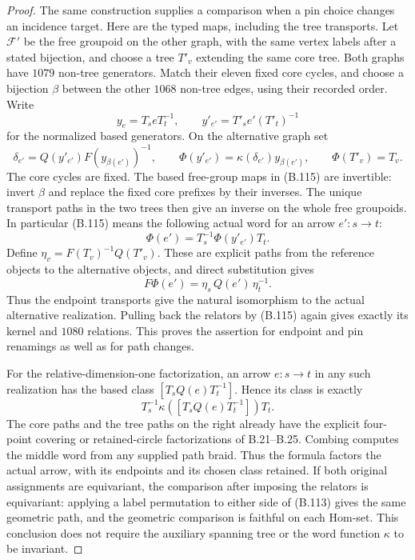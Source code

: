 \begin{proof}
The same construction supplies a comparison when a pin
choice changes an incidence target.  Here are the typed
maps, including the tree transports.  Let $\mathcal F'$
be the free groupoid on the other graph, with the same
vertex labels after a stated bijection, and choose a tree
$T'_v$ extending the same core tree.  Both graphs have
$1079$ non-tree generators.  Match their eleven fixed
core cycles, and choose a bijection $\beta$ between the
other $1068$ non-tree edges, using their recorded order.
Write
\[
 y_e=T_s eT_t^{-1},\qquad
 y'_{e'}=T'_s e'(T'_t)^{-1}
\]
for the normalized based generators.  On the alternative
graph set
\[
 \delta_{e'}=Q(y'_{e'})F(y_{\beta(e')})^{-1},\qquad
 \Phi(y'_{e'})=\kappa(\delta_{e'})y_{\beta(e')},\qquad
 \Phi(T'_v)=T_v.                                               \tag{B.115}
\]
The core cycles are fixed.  The based free-group maps in
(B.115) are invertible: invert $\beta$ and replace the
fixed core prefixes by their inverses.  The unique
transport paths in the two trees then give an inverse
on the whole free groupoids.  In particular (B.115)
means the following actual word for an arrow $e':s\to t$:
\[
 \Phi(e')=T_s^{-1}\Phi(y'_{e'})T_t.                            \tag{B.116}
\]
Define $\eta_v=F(T_v)^{-1}Q(T'_v)$.  These are explicit
paths from the reference objects to the alternative
objects, and direct substitution gives
\[
 F\Phi(e')=\eta_s\,Q(e')\,\eta_t^{-1}.                         \tag{B.117}
\]
Thus the endpoint transports give the natural isomorphism
to the actual alternative realization.  Pulling back the
relators by (B.115) again gives exactly its kernel and
$1080$ relations.  This proves the assertion for endpoint
and pin renamings as well as for path changes.

For the relative-dimension-one factorization, an arrow
$e:s\to t$ in any such realization has the based class
$[T_sQ(e)T_t^{-1}]$.  Hence its class is exactly
\[
 T_s^{-1}\kappa([T_sQ(e)T_t^{-1}])T_t.                          \tag{B.118}
\]
The core paths and the tree paths on the right already
have the explicit four-point covering or retained-circle
factorizations of B.21--B.25.  Combing computes the middle
word from any supplied path braid.  Thus the formula
factors the actual arrow, with its endpoints and its
chosen class retained.  If both original assignments
are equivariant, the comparison after imposing the
relators is equivariant: applying a label permutation
to either side of (B.113) gives the same geometric path,
and the geometric comparison is faithful on each
Hom-set.  This conclusion does not require the auxiliary
spanning tree or the word function $\kappa$ to be invariant.


\end{proof}
